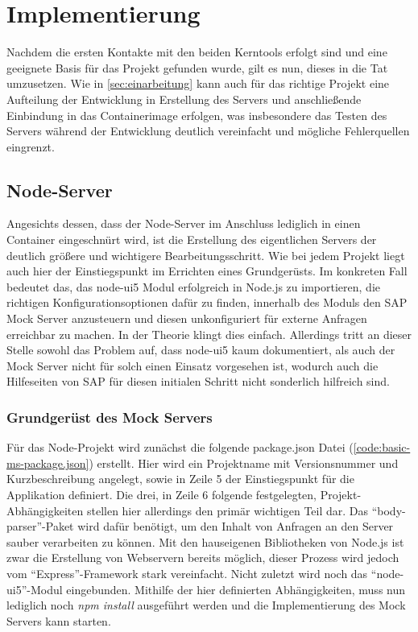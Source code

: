 \chapter{Implementierung}
Nachdem die ersten Kontakte mit den beiden Kerntools erfolgt sind und eine geeignete Basis für das Projekt gefunden wurde, gilt es nun, dieses in die Tat umzusetzen.
Wie in \autoref{sec:einarbeitung} kann auch für das richtige Projekt eine Aufteilung der Entwicklung in Erstellung des Servers und anschließende Einbindung in das Containerimage erfolgen, was insbesondere das Testen des Servers während der Entwicklung deutlich vereinfacht und mögliche Fehlerquellen eingrenzt.

\section{Node-Server}
Angesichts dessen, dass der Node-Server im Anschluss lediglich in einen Container eingeschnürt wird, ist die Erstellung des eigentlichen Servers der deutlich größere und wichtigere Bearbeitungsschritt.
Wie bei jedem Projekt liegt auch hier der Einstiegspunkt im Errichten eines Grundgerüsts.
Im konkreten Fall bedeutet das, das node-ui5 Modul erfolgreich in Node.js zu importieren, die richtigen Konfigurationsoptionen dafür zu finden, innerhalb des Moduls den SAP Mock Server anzusteuern und diesen unkonfiguriert für externe Anfragen erreichbar zu machen.
In der Theorie klingt dies einfach.
Allerdings tritt an dieser Stelle sowohl das Problem auf, dass node-ui5 kaum dokumentiert, als auch der Mock Server nicht für solch einen Einsatz vorgesehen ist, wodurch auch die Hilfeseiten von SAP für diesen initialen Schritt nicht sonderlich hilfreich sind.

\subsection{Grundgerüst des Mock Servers}
\label{subsec:foundation}
Für das Node-Projekt wird zunächst die folgende package.json Datei (\autoref{code:basic-ms-package.json}) erstellt.
Hier wird ein Projektname mit Versionsnummer und Kurzbeschreibung angelegt, sowie in Zeile 5 der Einstiegspunkt für die Applikation definiert.
Die drei, in Zeile 6 folgende festgelegten, Projekt-Abhängigkeiten stellen hier allerdings den primär wichtigen Teil dar.
Das \enquote{body-parser}-Paket wird dafür benötigt, um den Inhalt von Anfragen an den Server sauber verarbeiten zu können.
Mit den hauseigenen Bibliotheken von Node.js ist zwar die Erstellung von Webservern bereits möglich, dieser Prozess wird jedoch vom \enquote{Express}-Framework stark vereinfacht.
Nicht zuletzt wird noch das \enquote{node-ui5}-Modul eingebunden.
Mithilfe der hier definierten Abhängigkeiten, muss nun lediglich noch \emph{npm install} ausgeführt werden und die Implementierung des Mock Servers kann starten.


